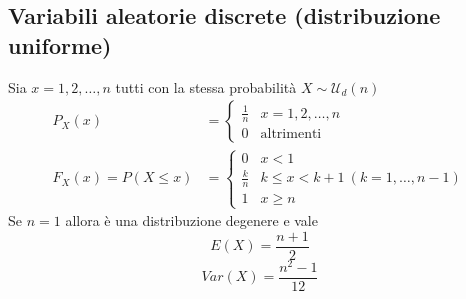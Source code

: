\begin{multicols*}{2}
\subsection*{Variabili aleatorie discrete (distribuzione uniforme)}
Sia $x = 1,2,\dots,n$ tutti con la stessa probabilità $X \sim \mathscr{U}_d(n) $
\begin{align*}
    P_X(x) &=
    \begin{cases}
        \frac{1}{n} & x = 1,2,\dots,n\\
        0 & \text {altrimenti}
    \end{cases}
    \\
    F_X(x) = P(X \le x) &=
    \begin{cases}
        0 & x < 1\\
        \frac{k}{n} & k \le x < k + 1 \ (k = 1,\dots,n-1)\\
        1 & x \ge n
    \end{cases}
\end{align*}
Se $n = 1$ allora è una distribuzione degenere e vale
$$
E(X) = \frac{n+1}{2}
$$
$$
\mathit{Var}(X) = \frac{n^2-1}{12}
$$

\end{multicols*}